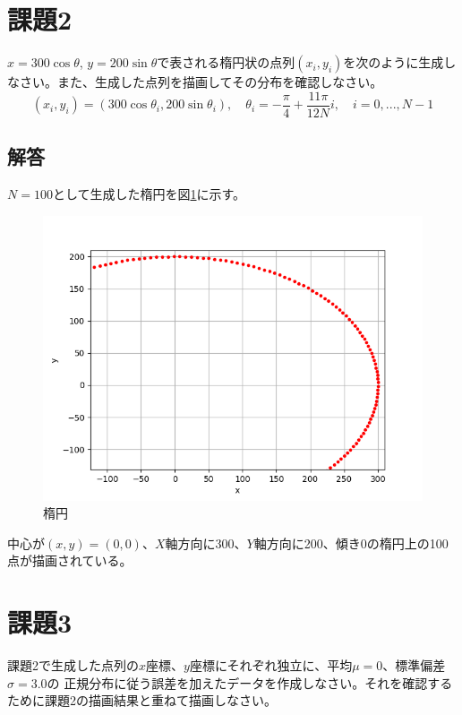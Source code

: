 \documentclass[]{jarticle}          %
\begin{document}
\section{課題2}
$x=300\cos\theta$, $y=200\sin\theta$で表される楕円状の点列$(x_i,y_i)$を次のように生成しなさい。また、生成した点列を描画してその分布を確認しなさい。
\begin{equation}
  (x_i,y_i)=(300\cos\theta_i, 200\sin\theta_i),\quad \theta_i = - \frac{\pi}{4}+\frac{11\pi}{12N}i,\quad i = 0,...,N-1
\end{equation}
\subsection{解答}
$N=100$として生成した楕円を図\ref{figone}に示す。
\begin{figure}[!ht]
  \begin{center}
    \includegraphics[keepaspectratio, width=0.7\linewidth]{figures/kadai2.png}
  \end{center}
  \caption{楕円}
  \label{figone}
\end{figure}

中心が$(x,y)=(0,0)$、$X$軸方向に300、$Y$軸方向に200、傾き0の楕円上の100点が描画されている。

\section{課題3}
課題2で生成した点列の$x$座標、$y$座標にそれぞれ独立に、平均$\mu = 0$、標準偏差$\sigma = 3.0$の
正規分布に従う誤差を加えたデータを作成しなさい。それを確認するために課題2の描画結果と重ねて描画しなさい。
\end{document}
